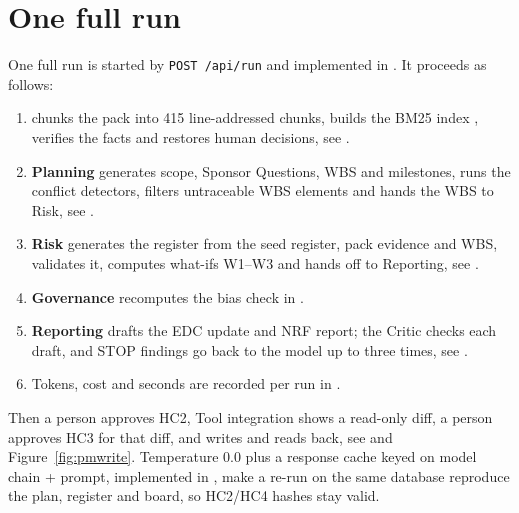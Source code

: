 \section{One full run}
\label{sec:fullrun}

One full run is started by \texttt{POST /api/run} and implemented in . It proceeds as follows:

\begin{enumerate}[leftmargin=*,itemsep=2pt]
  \item {} chunks the pack into 415 line-addressed chunks, builds the BM25 index \parencite{robertson2009bm25}, verifies the facts and restores human decisions, see .
  \item \textbf{Planning} generates scope, Sponsor Questions, WBS and milestones, runs the conflict detectors, filters untraceable WBS elements and hands the WBS to Risk, see .
  \item \textbf{Risk} generates the register from the seed register, pack evidence and WBS, validates it, computes what-ifs W1--W3 and hands off to Reporting, see .
  \item \textbf{Governance} recomputes the bias check in .
  \item \textbf{Reporting} drafts the EDC update and NRF report; the Critic checks each draft, and STOP findings go back to the model up to three times, see .
  \item Tokens, cost and seconds are recorded per run in .
\end{enumerate}

Then a person approves HC2, Tool integration shows a read-only diff, a person approves HC3 for that diff, and  writes and reads back, see  and Figure~\ref{fig:pmwrite}. Temperature 0.0 plus a response cache keyed on model chain + prompt, implemented in , make a re-run on the same database reproduce the plan, register and board, so HC2/HC4 hashes stay valid.

